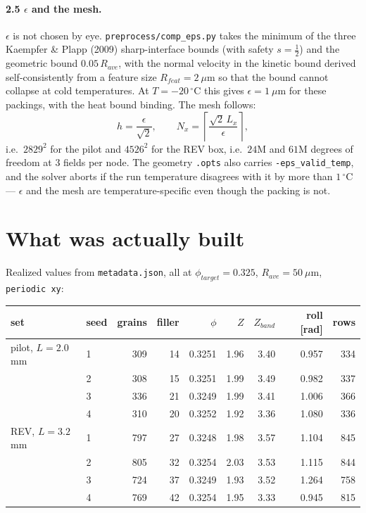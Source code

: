\documentclass[11pt]{article}
\newcommand{\code}[1]{\texttt{\small #1}}
\begin{document}
\paragraph{2.5 $\epsilon$ and the mesh.}
$\epsilon$ is not chosen by eye. \code{preprocess/comp\_eps.py} takes the
minimum of the three Kaempfer \& Plapp (2009) sharp-interface bounds (with
safety $s=\tfrac12$) and the geometric bound $0.05\,R_{ave}$, with the
normal velocity in the kinetic bound derived self-consistently from a
feature size $R_{feat} = 2\ \mu$m so that the bound cannot collapse at cold
temperatures. At $T=-20\,^\circ$C this gives $\epsilon = 1\ \mu$m for these
packings, with the heat bound binding. The mesh follows:
%
\begin{equation}
  h = \frac{\epsilon}{\sqrt{2}}, \qquad
  N_x = \left\lceil \frac{\sqrt{2}\,L_x}{\epsilon} \right\rceil,
\end{equation}
%
i.e.\ $2829^2$ for the pilot and $4526^2$ for the REV box, i.e.\ $24$M and
$61$M degrees of freedom at $3$ fields per node. The geometry \code{.opts}
also carries \code{-eps\_valid\_temp}, and the solver aborts if the run
temperature disagrees with it by more than $1\,^\circ$C --- $\epsilon$ and
the mesh are temperature-specific even though the packing is not.

\section{What was actually built}

Realized values from \code{metadata.json}, all at $\phi_{target}=0.325$,
$R_{ave}=50\ \mu$m, \code{periodic xy}:

\begin{center}
\small
\begin{tabular}{llrrrrrrr}
\toprule
set & seed & grains & filler & $\phi$ & $Z$ & $Z_{band}$ & roll [rad] & rows \\
\midrule
pilot, $L=2.0$\,mm   & 1 & 309 & 14 & 0.3251 & 1.96 & 3.40 & 0.957 & 334 \\
                     & 2 & 308 & 15 & 0.3251 & 1.99 & 3.49 & 0.982 & 337 \\
                     & 3 & 336 & 21 & 0.3249 & 1.99 & 3.41 & 1.006 & 366 \\
                     & 4 & 310 & 20 & 0.3252 & 1.92 & 3.36 & 1.080 & 336 \\
\midrule
REV, $L=3.2$\,mm     & 1 & 797 & 27 & 0.3248 & 1.98 & 3.57 & 1.104 & 845 \\
                     & 2 & 805 & 32 & 0.3254 & 2.03 & 3.53 & 1.115 & 844 \\
                     & 3 & 724 & 37 & 0.3249 & 1.93 & 3.52 & 1.264 & 758 \\
                     & 4 & 769 & 42 & 0.3254 & 1.95 & 3.33 & 0.945 & 815 \\
\bottomrule
\end{tabular}
\end{center}
\end{document}
